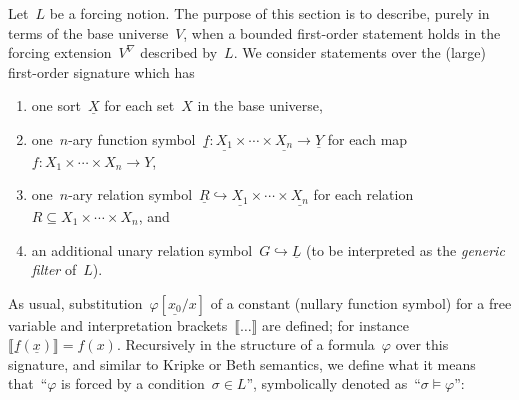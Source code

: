\documentclass[com,11pt,crcready]{iosart2x}
\theoremstyle{definition}
\theoremstyle{plain}
\theoremstyle{remark}
\newcommand{\?}{\,{:}\,}
\newcommand{\forces}{\vDash}
\renewcommand{\_}{\mathpunct{.}\,}
\begin{document}
Let~$L$ be a forcing notion. The purpose of this section is to describe, purely
in terms of the base universe~$V$, when a bounded first-order statement holds
in the forcing extension~$V^\nabla$ described by~$L$. We consider statements
over the (large) first-order signature which has
\begin{enumerate}
\item one sort~$\underline{X}$ for each set~$X$ in the base universe,
\item one~$n$-ary function symbol~$\underline{f} : \underline{X_1} \times
\cdots \times \underline{X_n} \to \underline{Y}$ for each map~$f : X_1 \times
\cdots \times X_n \to Y$,
\item one~$n$-ary relation symbol~$\underline{R} \hookrightarrow
\underline{X_1} \times \cdots \times \underline{X_n}$ for each relation~$R
\subseteq X_1 \times \cdots \times X_n$, and
\item an additional unary relation symbol~$G \hookrightarrow \underline{L}$ (to
be interpreted as the \emph{generic filter} of~$L$).
\end{enumerate}
As usual, substitution~$\varphi[\underline{x_0}/x]$ of a constant (nullary
function symbol) for a free variable and interpretation
brackets~$\llbracket\ldots\rrbracket$ are defined; for
instance~$\llbracket\underline{f}(\underline{x})\rrbracket = f(x)$.
Recursively in the structure of a formula~$\varphi$ over this signature, and
similar to Kripke or Beth semantics, we define what it means that~``$\varphi$
is forced by a condition~$\sigma \in L$'', symbolically denoted as~``$\sigma
\forces \varphi$'':
\newcommand{\defeqv}{\quad\text{iff}\quad}
\end{document}
